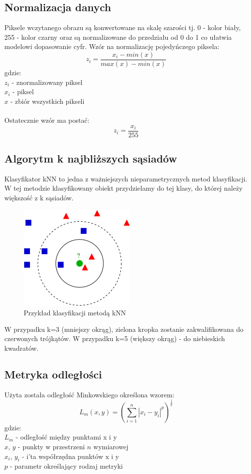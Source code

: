 \documentclass[12pt,a4paper]{article}
\begin{document}
\subsection{Normalizacja danych}
Piksele wczytanego obrazu są konwertowane na skalę szarości tj. 0 - kolor biały, 255 - kolor czarny
oraz są normalizowane do przedziału od 0 do 1 co ułatwia modelowi dopasowanie cyfr.
Wzór na normalizację pojedyńczego piksela:
\[
	z_i=\frac{x_i - min(x)}{max(x) - min(x)}
\]
gdzie: \\
\indent $z_i$ - znormalizowany piksel\\
\indent $x_i$ - piksel\\
\indent $x$ - zbiór wszystkich pikseli\\~\\
Ostatecznie wzór ma postać:
\[
	z_i=\frac{x_i}{255}
\]
\subsection{Algorytm k najbliższych sąsiadów}
Klasyfikator kNN to jedna z ważniejszych nieparametrycznych metod klasyfikacji. W tej metodzie
klasyfikowany obiekt przydzielamy do tej klasy, do której należy większość z k sąsiadów.
\begin{figure}[!h]
	\includegraphics{"KnnClassification.png"}
	\centering
	\caption{Przykład klasyfikacji metodą kNN}
\end{figure}

W przypadku k=3 (mniejszy okrąg), zielona kropka zostanie zakwalifikowana do czerwonych
trójkątów. W przypadku k=5 (większy okrąg) - do niebieskich kwadratów.

\subsection{Metryka odległości}
Użyta została odległość Minkowskiego określona wzorem:
\[
	L_m(x, y) = \left(\sum_{i = 1}^{n} |x_i - y_i|^p\right)^\frac{1}{p}
\]
gdzie: \\
\indent $L_m$ - odległość między punktami x i y\\
\indent $x$, $y$ - punkty w przestrzeni $n$ wymiarowej\\
\indent $x_i$, $y_i$ - i'ta współrzędna punktów x i y\\
\indent $p$ - parametr określający rodzaj metryki\\
\end{document}
